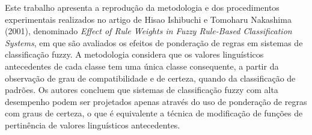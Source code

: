 \documentclass[12pt,a4paper]{article}
\newcommand{\farcm}{\mbox{\ensuremath{.\mkern-4mu^\prime}}}%
\newcommand{\farcs}{\mbox{\ensuremath{.\!\!^{\prime\prime}}}}
\newcommand{\ii }{\'{\i}}
\newcommand{\cc }{\c c}
\newcommand{\cca}{\c ca }
\newcommand{\ao}{\~ao }
\newcommand{\cao}{\c c\~ao }
\newcommand{\oes}{\~oes }
\newcommand{\coes}{\c c\~oes }
\newcommand{\eq}{\begin{equation}}
\newcommand{\feq}{\end{equation}}
\newcommand{\dm}{\begin{displaymath}}
\newcommand{\fdm}{\end{displaymath}}
\newcommand{\eqn}{\begin{eqnarray}}
\newcommand{\feqn}{\end{eqnarray}}
\newcommand{\grau}{^{\circ}}
\newcommand{\ba}{\arrowvert_{t_1}^{t_2}}
\newcommand{\bc}{\arrowvert_{0^{\circ} {\rm C}}^{t_2}}
\newcommand{\bb}{\arrowvert_{0^{\circ} {\rm C}}^{t_1}}
\newcommand{\Ms}{$\mathrm{M}_{\odot}$}
\newcommand{\reg}[1]{#1$^{\tiny{\circledR}}$}
\renewcommand{\baselinestretch}{1.5}
\providecommand{\sin}{} \renewcommand{\sin}{\hspace{2pt}\mathrm{sen}}
\numberwithin{equation}{section}
\begin{document}
%
%

{\abstract
Este trabalho apresenta a reprodução da metodologia e dos procedimentos experimentais realizados no artigo de Hisao Ishibuchi e Tomoharu Nakashima (2001), denominado \textit{Effect of Rule Weights in Fuzzy Rule-Based Classification Systems}, em que são avaliados os efeitos de ponderação de regras em sistemas de classificação fuzzy. A metodologia considera que os valores linguísticos antecedentes de cada classe tem uma única classe consequente, a partir da observação de grau de compatibilidade e de certeza, quando da classificação de padrões. Os autores concluem que sistemas de classificação fuzzy com alta desempenho podem ser projetados apenas através do uso de ponderação de regras com graus de certeza, o que é equivalente a técnica de modificação de funções de pertinência de valores linguísticos antecedentes.}
\newpage
\end{document}
